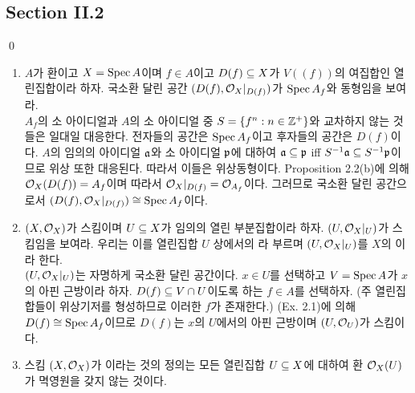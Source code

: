 	
	\subsection*{Section II.2}
	
	\begin{lemma}
		\qed
	\end{lemma}
	
	\begin{enumerate}[label=\tb{2.\arabic*.},itemindent=0mm,itemsep=4mm]
	\item $A$가 환이고 $X=\operatorname{Spec} A$이며 $f\in A$이고 $D(f)\subseteq X$가 $V((f))$의 여집합인 열린집합이라 하자.
	국소환 달린 공간 $(D(f),\mathcal{O}_X|_{D(f)})$가 $\operatorname{Spec} A_f$와 동형임을 보여라.\\
	\sol $A_f$의 소 아이디얼과 $A$의 소 아이디얼 중 $S=\{f^n:n\in\mathbb Z^+\}$와 교차하지 않는 것들은 일대일 대응한다.
	전자들의 공간은 $\operatorname{Spec} A_f$이고 후자들의 공간은 $D(f)$이다. $A$의 임의의 아이디얼 $\mathfrak{a}$와 소 아이디얼 $\mathfrak{p}$에 대하여
	$\mathfrak{a}\subseteq\mathfrak{p}$ iff $S^{-1}\mathfrak{a}\subseteq S^{-1}\mathfrak{p}$이므로 위상 또한 대응된다. 따라서 이들은 위상동형이다.
	Proposition 2.2(b)에 의해 $\mathcal{O}_X(D(f))=A_f$이며 따라서 $\mathcal{O}_X|_{D(f)}=\mathcal{O}_{A_f}$이다.
	그러므로 국소환 달린 공간으로서 $(D(f),\mathcal{O}_X|_{D(f)})\cong\operatorname{Spec} A_f$이다.
	\item $(X,\mathcal{O}_X)$가 스킴이며 $U\subseteq X$가 임의의 열린 부분집합이라 하자.
	$(U,\mathcal{O}_X|_U)$가 스킴임을 보여라. 우리는 이를 열린집합 $U$ 상에서의 라 부르며
	$(U,\mathcal{O}_X|_U)$를 $X$의 이라 한다.\\
	\sol $(U,\mathcal{O}_X|_U)$는 자명하게 국소환 달린 공간이다. $x\in U$를 선택하고 $V=\operatorname{Spec} A$가 $x$의 아핀 근방이라 하자.
	$D(f)\subseteq V\cap U$이도록 하는 $f\in A$를 선택하자. (주 열린집합들이 위상기저를 형성하므로 이러한 $f$가 존재한다.)
	(Ex. 2.1)에 의해 $D(f)\cong\operatorname{Spec} A_f$이므로 $D(f)$는 $x$의 $U$에서의 아핀 근방이며 $(U,\mathcal{O}_U)$가 스킴이다.
	\item {} 스킴 $(X,\mathcal{O}_X)$가 이라는 것의 정의는
	모든 열린집합 $U\subseteq X$에 대하여 환 $\mathcal{O}_X(U)$가 멱영원을 갖지 않는 것이다.

\end{enumerate}
